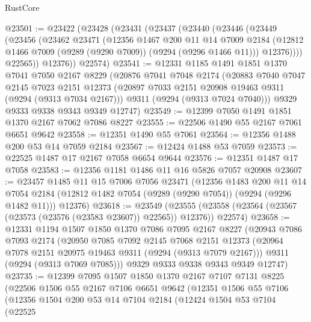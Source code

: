 \begin{lexlean}{RustCore}
\begin{coremodule}
@23501 := @23422
    (@23428
      (@23431
        (@23437
          (@23440
            (@23446
              (@23449
                (@23456
                  (@23462
                    @23471
                    (@12356
                      @1467
                      @200
                      @11
                      @14
                      @7009
                      @2184
                      (@12812 @1466 @7009 (@9289 (@9290 @7009)) (@9294 (@9296 @1466 @11)))
                      @12376))))
              @22565))
          @12376))
      @22574)
@23541 := @12331
    @1185
    @1491
    @1851
    @1370
    @7041
    @7050
    @2167
    @8229
    (@20876
      @7041
      @7048
      @2174
      (@20883
        @7040
        @7047
        @2145
        @7023
        @2151
        @12373
        (@20897 @7033 @2151 @20908 @19463 @9311 (@9294 (@9313 @7034 @2167)))
        @9311
        (@9294 (@9313 @7024 @7040)))
      @9329
      @9333
      @9338
      @9343
      @9349
      @12747)
@23549 := @12399 @7050 @1491 @1851 @1370 @2167 @7062 @7086 @8227
@23555 := @22506 @1490 @55 @2167 @7061 @6651 @9642
@23558 := @12351 @1490 @55 @7061
@23564 := @12356 @1488 @200 @53 @14 @7059 @2184
@23567 := @12424 @1488 @53 @7059
@23573 := @22525 @1487 @17 @2167 @7058 @6654 @9644
@23576 := @12351 @1487 @17 @7058
@23583 := @12356 @1181 @1486 @11 @16 @5826 @7057 @20908
@23607 := @23457
    @1485
    @11
    @15
    @7006
    @7056
    @23471
    (@12356
      @1483
      @200
      @11
      @14
      @7054
      @2184
      (@12812 @1482 @7054 (@9289 (@9290 @7054)) (@9294 (@9296 @1482 @11)))
      @12376)
@23618 := @23549
    (@23555 (@23558 (@23564 (@23567 (@23573 (@23576 (@23583 @23607)) @22565)) @12376)) @22574)
@23658 := @12331
    @1194
    @1507
    @1850
    @1370
    @7086
    @7095
    @2167
    @8227
    (@20943
      @7086
      @7093
      @2174
      (@20950
        @7085
        @7092
        @2145
        @7068
        @2151
        @12373
        (@20964 @7078 @2151 @20975 @19463 @9311 (@9294 (@9313 @7079 @2167)))
        @9311
        (@9294 (@9313 @7069 @7085)))
      @9329
      @9333
      @9338
      @9343
      @9349
      @12747)
@23735 := @12399
    @7095
    @1507
    @1850
    @1370
    @2167
    @7107
    @7131
    @8225
    (@22506
      @1506
      @55
      @2167
      @7106
      @6651
      @9642
      (@12351
        @1506
        @55
        @7106
        (@12356
          @1504
          @200
          @53
          @14
          @7104
          @2184
          (@12424
            @1504
            @53
            @7104
            (@22525

\end{coremodule}
\end{lexlean}
